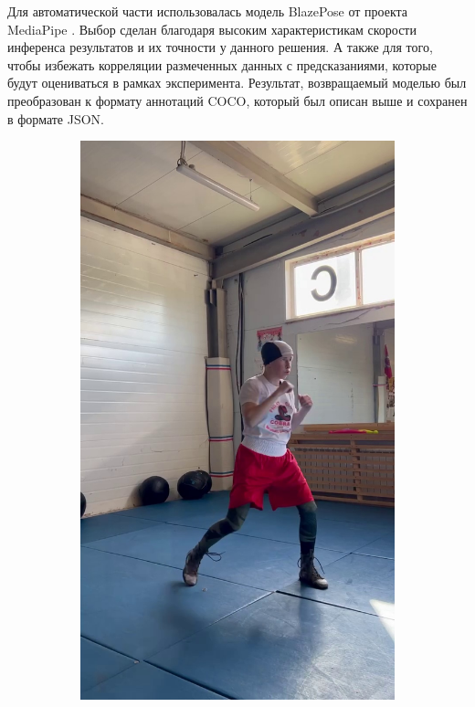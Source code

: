 Для автоматической части использовалась модель BlazePose от проекта MediaPipe \cite{mediapipe}. Выбор сделан благодаря высоким характеристикам скорости инференса результатов и их точности у данного решения. А также для того, чтобы избежать корреляции размеченных данных с предсказаниями, которые будут оцениваться в рамках эксперимента. Результат, возвращаемый моделью был преобразован к формату аннотаций COCO, который был описан выше и сохранен в формате JSON. 

\begin{figure}[h]
\begin{subfigure}[b]{0.32\textwidth}
	\centering
	\includegraphics[width=\textwidth]{./images/experiment/data_info/pose_markup_examples/raw}

\end{subfigure}
\end{figure}
